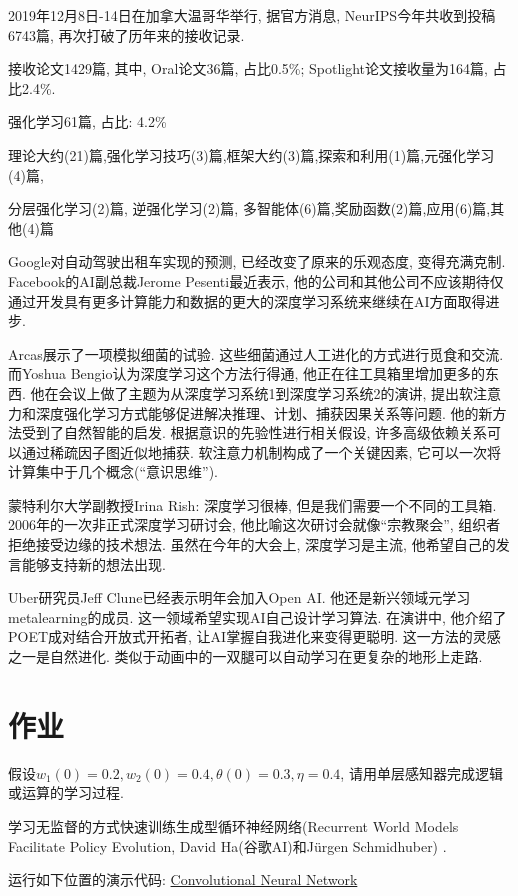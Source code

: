 2019年12月8日-14日在加拿大温哥华举行, 据官方消息, NeurIPS今年共收到投稿6743篇, 再次打破了历年来的接收记录. 

接收论文1429篇, 其中, Oral论文36篇, 占比0.5\%; Spotlight论文接收量为164篇, 占比2.4\%.

强化学习61篇, 占比: 4.2\%

理论大约(21)篇,强化学习技巧(3)篇,框架大约(3)篇,探索和利用(1)篇,元强化学习(4)篇,

分层强化学习(2)篇, 逆强化学习(2)篇, 多智能体(6)篇,奖励函数(2)篇,应用(6)篇,其他(4)篇

Google对自动驾驶出租车实现的预测, 已经改变了原来的乐观态度, 变得充满克制.
Facebook的AI副总裁Jerome Pesenti最近表示, 他的公司和其他公司不应该期待仅通过开发具有更多计算能力和数据的更大的深度学习系统来继续在AI方面取得进步.

Arcas展示了一项模拟细菌的试验. 这些细菌通过人工进化的方式进行觅食和交流.
而Yoshua Bengio认为深度学习这个方法行得通, 他正在往工具箱里增加更多的东西.
他在会议上做了主题为从深度学习系统1到深度学习系统2的演讲, 提出软注意力和深度强化学习方式能够促进解决推理、计划、捕获因果关系等问题.
他的新方法受到了自然智能的启发. 根据意识的先验性进行相关假设, 许多高级依赖关系可以通过稀疏因子图近似地捕获. 软注意力机制构成了一个关键因素, 它可以一次将计算集中于几个概念(“意识思维”).

蒙特利尔大学副教授Irina Rish: 深度学习很棒, 但是我们需要一个不同的工具箱.
2006年的一次非正式深度学习研讨会, 他比喻这次研讨会就像“宗教聚会”, 组织者拒绝接受边缘的技术想法.
虽然在今年的大会上, 深度学习是主流, 他希望自己的发言能够支持新的想法出现.

Uber研究员Jeff Clune已经表示明年会加入Open AI. 
他还是新兴领域元学习metalearning的成员. 这一领域希望实现AI自己设计学习算法.
在演讲中, 他介绍了POET成对结合开放式开拓者, 让AI掌握自我进化来变得更聪明. 
这一方法的灵感之一是自然进化. 类似于动画中的一双腿可以自动学习在更复杂的地形上走路.
\section{作业}
\begin{think}
    假设$w_1(0)=0.2, w_2(0)=0.4, \theta(0)=0.3, \eta=0.4$, 请用单层感知器完成逻辑或运算的学习过程.
\end{think}

\begin{think}
    学习无监督的方式快速训练生成型循环神经网络(Recurrent World Models Facilitate Policy Evolution, David Ha(谷歌AI)和Jürgen Schmidhuber) \cite{ha2018worldmodels}.
\end{think}

\begin{think}
    运行如下位置的演示代码: \href{https://colab.research.google.com/drive/16a3G7Hh8Pv1X1PhZAUBEnZEkXThzDeHJ#scrollTo=D_a2USyd4giE}{Convolutional Neural Network}
\end{think}
